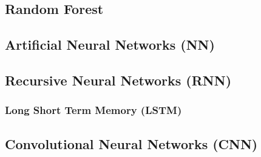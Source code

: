 \subsection{Random Forest}
\label{ml:supervised:RF}

\subsection{Artificial Neural Networks (NN)}
\label{ml:supervised:ANN}

\subsection{Recursive Neural Networks (RNN)}
\label{ml:supervised:RNN}

\subsubsection{Long Short Term Memory (LSTM)}
\label{ml:supervised:RNN:LSTM}

\subsection{Convolutional Neural Networks (CNN)}
\label{ml:supervised:CNN}
